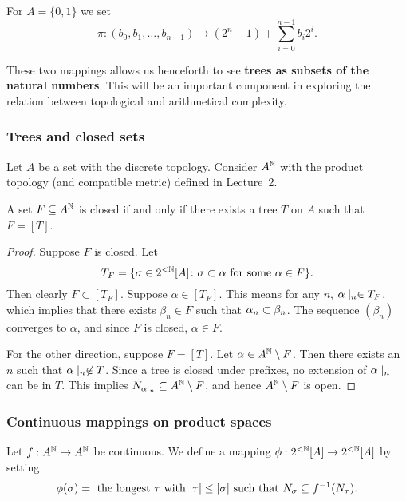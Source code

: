 For $A = \{0,1\}$ we set
\begin{equation*}
\pi: (b_0,b_1, \dots, b_{n-1}) \mapsto (2^n-1) + \sum_{i=0}^{n-1} b_i 2^i.
\end{equation*}

These two mappings allows us henceforth to see \textbf{trees as subsets of the natural numbers}. This will be an important component in exploring the relation between topological and arithmetical complexity.

\subsubsection{Trees and closed sets}

Let $A$ be a set with the discrete topology. Consider $A^{\mathbb{N}}$ with the product topology (and compatible metric) defined in Lecture~2.

\begin{proposition}\label{prop-trees-closed}A set $F \subseteq A^{\mathbb{N}}$ is closed if and only if there exists a tree $T$ on $A$ such that $F = [T]$.

\end{proposition}\begin{proof}Suppose $F$ is closed. Let
\begin{equation*}
T_F = \{\sigma \in 2^{<\mathbb{N}}[A] \colon \sigma \subset \alpha \text{ for some }\alpha \in F\}.
\end{equation*}
Then clearly $F \subset [T_F]$. Suppose $\alpha \in [T_F]$. This means for any $n$, $\alpha\mid_{n} \in T_F$, which implies that there exists $\beta_n \in F$ such that $\alpha_n \subset \beta_n$. The sequence $(\beta_n)$ converges to $\alpha$, and since $F$ is closed, $\alpha \in F$.

For the other direction, suppose $F = [T]$. Let $\alpha \in A^{\mathbb{N}} \setminus F$. Then there exists an $n$ such that $\alpha\mid_{n} \not\in T$. Since a tree is closed under prefixes, no extension of $\alpha\mid_{n}$ can be in $T$. This implies $N_{\alpha\mid_{n}} \subseteq A^{\mathbb{N}} \setminus F$, and hence $A^{\mathbb{N}} \setminus F$ is open.

\end{proof}\subsubsection{Continuous mappings on product spaces}

Let $f: A^{\mathbb{N}} \to A^{\mathbb{N}}$ be continuous. We define a mapping $\phi: 2^{<\mathbb{N}}[A] \to 2^{<\mathbb{N}}[A]$ by setting
\begin{equation*}
\phi(\sigma) = \text{ the longest $\tau$ with $|\tau| \leq |\sigma|$ such that } N_{\sigma} \subseteq f^{-1}(N_{\tau}).
\end{equation*}


